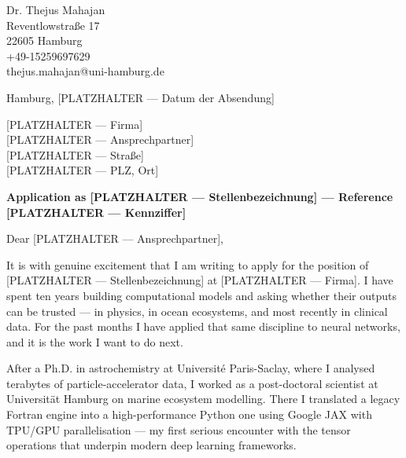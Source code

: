 \documentclass[11pt, a4paper]{article}
\begin{document}
\pagestyle{empty}

\begin{flushleft}
Dr. Thejus Mahajan\\
Reventlowstra{\ss}e 17\\
22605 Hamburg\\
+49-15259697629\\
thejus.mahajan@uni-hamburg.de
\end{flushleft}

\vspace{0.15cm}

\begin{flushright}
Hamburg, [PLATZHALTER --- Datum der Absendung]
\end{flushright}

\vspace{0.15cm}

\begin{flushleft}
{[PLATZHALTER --- Firma]}\\
{[PLATZHALTER --- Ansprechpartner]}\\
{[PLATZHALTER --- Stra{\ss}e]}\\
{[PLATZHALTER --- PLZ, Ort]}
\end{flushleft}

\vspace{0.15cm}

\textbf{Application as [PLATZHALTER --- Stellenbezeichnung] --- Reference [PLATZHALTER --- Kennziffer]}

\vspace{0.3em}
Dear [PLATZHALTER --- Ansprechpartner],

\vspace{0.2cm}

It is with genuine excitement that I am writing to apply for the position of
[PLATZHALTER --- Stellenbezeichnung] at [PLATZHALTER --- Firma]. I have spent
ten years building computational models and asking whether their outputs can be
trusted --- in physics, in ocean ecosystems, and most recently in clinical data.
For the past months I have applied that same discipline to neural networks, and
it is the work I want to do next.

After a Ph.D. in astrochemistry at Universit\'e Paris-Saclay, where I analysed
terabytes of particle-accelerator data, I worked as a post-doctoral scientist at
Universit\"at Hamburg on marine ecosystem modelling. There I translated a legacy
Fortran engine into a high-performance Python one using Google JAX with TPU/GPU
parallelisation --- my first serious encounter with the tensor operations that
underpin modern deep learning frameworks.
\end{document}

